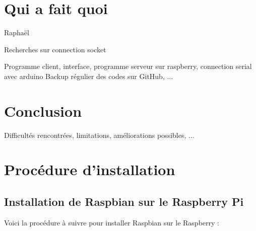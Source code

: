 \documentclass[12pt,a4paper]{report}
\begin{document}
\chapter{Qui a fait quoi}

Raphaël

Recherches sur connection socket

Programme client, interface, programme serveur sur raspberry, connection serial avec arduino
Backup régulier des codes sur GitHub, ...

\chapter{Conclusion}

Difficultés rencontrées, limitations, améliorations possibles, ...

\appendix

\chapter{Procédure d'installation}

\section{Installation de Raspbian sur le Raspberry Pi}

Voici la procédure à suivre pour installer Raspbian sur le Raspberry :
\end{document}

